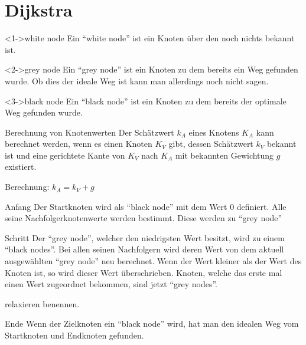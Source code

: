 \section{Dijkstra}


\begin{frame}
	\begin{block}<1->{white node}
		Ein ``white node'' ist ein Knoten über den noch nichts bekannt ist.
	\end{block}
	\begin{block}<2->{grey node}
		Ein ``grey node'' ist ein Knoten zu dem bereits ein Weg gefunden wurde. Ob dies der ideale Weg ist kann man allerdings noch nicht sagen.
	\end{block}
	\begin{block}<3->{black node}
		Ein ``black node'' ist ein Knoten zu dem bereits der optimale Weg gefunden wurde.
	\end{block}
\end{frame}

\begin{frame}
	\begin{block}{Berechnung von Knotenwerten}
		Der Schätzwert $k_A$ eines Knotens $K_A$ kann berechnet werden, wenn es einen Knoten $K_V$ gibt, dessen Schätzwert $k_V$ bekannt ist und eine gerichtete Kante von $K_V$ nach $K_A$ mit bekannten Gewichtung $g$ existiert.
	\end{block}
	\vfill
	Berechnung: $k_A = k_V + g$
\end{frame}

\begin{frame}
	\begin{block}{Anfang}
		Der Startknoten wird als ``black node'' mit dem Wert 0 definiert. 
		Alle seine Nachfolgerknotenwerte werden bestimmt. Diese werden zu ``grey node''
	\end{block}
\end{frame}
\begin{frame}
	\begin{block}{Schritt}
		Der ``grey node'', welcher den niedrigsten Wert besitzt, wird zu einem ``black nodes''.
		Bei allen seinen Nachfolgern wird deren Wert von dem aktuell ausgewählten ``grey node'' neu berechnet. Wenn der Wert kleiner als der Wert des Knoten ist, so wird dieser Wert überschrieben.
		Knoten, welche das erste mal einen Wert zugeordnet bekommen, sind jetzt ``grey nodes''.

		relaxieren benennen.
	\end{block}
\end{frame}
\begin{frame}
	\begin{block}{Ende}
		Wenn der Zielknoten ein ``black node'' wird, hat man den idealen Weg vom Startknoten und Endknoten gefunden.
	\end{block}

\end{frame}